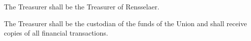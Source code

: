 The Treasurer shall be the Treasurer of Rensselaer.

\vspace{12pt}

The Treasurer shall be the custodian of the funds of the Union and shall receive copies of all financial transactions.